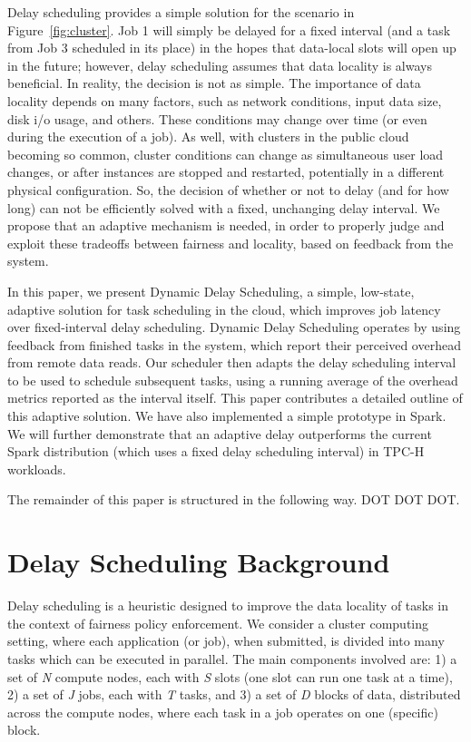 \documentclass[10pt,conference,compsocconf,letterpaper]{IEEEtran}
\begin{document}
Delay scheduling provides a simple solution for the scenario in 
Figure~\ref{fig:cluster}. Job 1 will simply be delayed for a fixed interval (and a task
from Job 3 scheduled in its place) in the hopes that data-local slots will open up in 
the future; however, delay scheduling assumes that data locality is always beneficial.
In reality, the decision is not as simple. The importance of data locality depends on many
factors, such as network conditions, input data size, disk i/o usage, and others. These
conditions may change over time (or even during the execution of a job). As well, with clusters
in the public cloud becoming so common, cluster conditions can change as simultaneous user
load changes, or after instances are stopped and restarted, potentially in a different physical
configuration. So, the
decision of whether or not to delay (and for how long) can not be efficiently solved with
a fixed, unchanging delay interval. We propose that an adaptive mechanism is needed,
in order to properly judge and exploit these tradeoffs between fairness and locality,
based on feedback from the system.

In this paper, we present Dynamic Delay Scheduling, a simple, low-state, adaptive
solution for task scheduling in the cloud, which improves job latency over
fixed-interval delay scheduling. Dynamic Delay Scheduling operates by using feedback from finished
tasks in the system, which report their perceived overhead from remote data
reads. Our scheduler then adapts the delay scheduling interval to be used to schedule subsequent
tasks, using a running average of the overhead metrics reported as the interval
itself. This paper contributes a detailed outline of this adaptive solution. We have
also implemented a simple prototype in Spark. We will further demonstrate that
an adaptive delay outperforms the current Spark distribution (which uses a fixed delay
scheduling interval) in TPC-H workloads.

The remainder of this paper is structured in the following way. DOT DOT DOT.


\section{Delay Scheduling Background}\label{sec:overview}

Delay scheduling is a heuristic designed to improve the data locality of tasks in the
context of fairness policy enforcement. We consider a cluster computing setting, where each 
application (or job), when submitted, is divided into many tasks which can be executed in 
parallel. The main components involved are: 1) a set of \textit{N} compute nodes, each with 
\textit{S} slots (one slot can run one task at a time), 2) a set of \textit{J} jobs, each 
with \textit{T} tasks, and 3) a set of \textit{D} blocks of data, distributed across the 
compute nodes, where each task in a job operates on one (specific) block.
\end{document}
